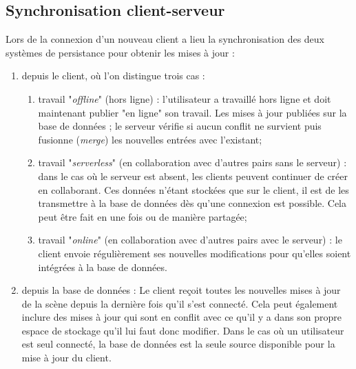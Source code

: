 \subsection{Synchronisation 
client-serveur}\label{sec:synchronisation-client-serveur}
Lors de la connexion d'un nouveau client a lieu la synchronisation des deux 
systèmes de persistance pour obtenir les mises à jour : 
\begin{enumerate}
	\item depuis le client, où l'on distingue trois cas :
	\begin{enumerate}
		\item travail "\textit{offline}" (hors ligne) : l'utilisateur a travaillé hors ligne et 
		doit maintenant publier "en ligne" son travail. Les mises à jour publiées sur la 
		base de données ; le serveur vérifie si aucun conflit ne survient puis 
		fusionne (\textit{merge}) les nouvelles entrées avec l'existant; 
		
		\item travail "\textit{serverless}" (en collaboration avec d'autres pairs sans le 
		serveur) : dans le cas où le serveur est absent, les clients peuvent continuer 
		de créer en collaborant. Ces données n'étant stockées que sur le client, il est 
		de les transmettre à la base de données dès qu'une connexion est possible. 
		Cela peut être fait en une fois ou de manière partagée;
		
		\item travail "\textit{online}" (en collaboration avec d'autres pairs avec le 
		serveur) : le client envoie régulièrement  ses 
		nouvelles modifications pour qu'elles soient intégrées à la base de données.
	\end{enumerate}
	\item depuis la base de données :
	Le client reçoit toutes les nouvelles mises à jour de la scène depuis la dernière 
	fois qu'il s'est connecté. Cela peut également inclure des mises à jour qui sont 
	en conflit avec ce qu'il y a dans son propre espace de stockage qu'il lui faut 
	donc modifier.
	Dans le cas où un utilisateur est seul connecté, la base de données est la 
	seule source disponible pour la mise à jour du client. 
\end{enumerate}
